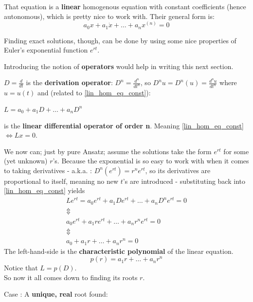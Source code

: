That equation is a \textbf{linear} homogenous equation with constant coefficients (hence autonomous), which is pretty nice to work with. Their general form is:
\begin{equation}\label{lin_hom_eq_const}
	a_0 x + a_1\dot{x}+ \dots +a_{n} x^{(n)} = 0
\end{equation}

Finding exact solutions, though, can be done by using some nice properties of Euler's exponential function $e^{rt}$.

Introducing the notion of \textbf{operators} would help in writing this next section.

\begin{definition}
	$D = \frac{d}{dt}$ is the \textbf{derivation operator}:
	$D^n = \frac{d^n}{dt^n}$, so $D^nu = D^n(u) =\frac{d^nu}{dt^n}$ where $u=u(t)$ and (related to \ref{lin_hom_eq_const}): \par
	\hspace{20pt} $L = a_0 + a_1D + \dots + a_nD^n$ \par
	\hspace{20pt} is the \textbf{linear differential operator of order n}. Meaning \ref{lin_hom_eq_const} $\iff Lx=0$.
\end{definition}

We now can; just by pure Ansatz; assume the solutions take the form $e^{rt}$ for some (yet unknown) $r$'s. Because the exponential is so easy to work with when it comes to taking derivatives - a.k.a. : $D^n(e^{rt})=r^ne^{rt}$, so its derivatives are proportional to itself, meaning no new $t$'s are introduced - substituting back into \ref{lin_hom_eq_const} yields
\begin{gather*}
	Le^{rt} = a_0 e^{rt} + a_1 De^{rt} + \dots +a_{n} D^ne^{rt} = 0      \\
	\Updownarrow \\
	a_0 e^{rt}+a_1re^{rt} + \dots + a_nr^ne^{rt} =0 \\
	\Updownarrow \\
	a_0 + a_1r + \dots + a_nr^n =0
\end{gather*}
The left-hand-side is the \textbf{characteristic polynomial} of the linear equation.
\begin{equation}\label{lin_eq_char_poly}
	p(r) = a_1r + \dots + a_nr^n
\end{equation}
Notice that $L = p(D)$. \\
So now it all comes down to finding its roots $r$.

Case : A \textbf{unique, real} root found:

